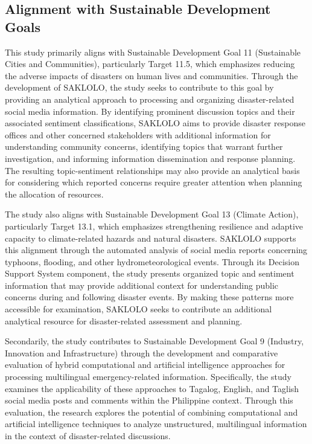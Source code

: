 \subsection*{Alignment with Sustainable Development Goals}
This study primarily aligns with \textcite{unrc2020sdg} Sustainable Development Goal 11 (Sustainable Cities and Communities), particularly Target 11.5, which emphasizes reducing the adverse impacts of disasters on human lives and communities. Through the development of SAKLOLO, the study seeks to contribute to this goal by providing an analytical approach to processing and organizing disaster-related social media information. By identifying prominent discussion topics and their associated sentiment classifications, SAKLOLO aims to provide disaster response offices and other concerned stakeholders with additional information for understanding community concerns, identifying topics that warrant further investigation, and informing information dissemination and response planning. The resulting topic-sentiment relationships may also provide an analytical basis for considering which reported concerns require greater attention when planning the allocation of resources.

The study also aligns with \textcite{unrc2020sdg} Sustainable Development Goal 13 (Climate Action), particularly Target 13.1, which emphasizes strengthening resilience and adaptive capacity to climate-related hazards and natural disasters. SAKLOLO supports this alignment through the automated analysis of social media reports concerning typhoons, flooding, and other hydrometeorological events. Through its Decision Support System component, the study presents organized topic and sentiment information that may provide additional context for understanding public concerns during and following disaster events. By making these patterns more accessible for examination, SAKLOLO seeks to contribute an additional analytical resource for disaster-related assessment and planning.

Secondarily, the study contributes to \textcite{unrc2020sdg} Sustainable Development Goal 9 (Industry, Innovation and Infrastructure) through the development and comparative evaluation of hybrid computational and artificial intelligence approaches for processing multilingual emergency-related information. Specifically, the study examines the applicability of these approaches to Tagalog, English, and Taglish social media posts and comments within the Philippine context. Through this evaluation, the research explores the potential of combining computational and artificial intelligence techniques to analyze unstructured, multilingual information in the context of disaster-related discussions.

